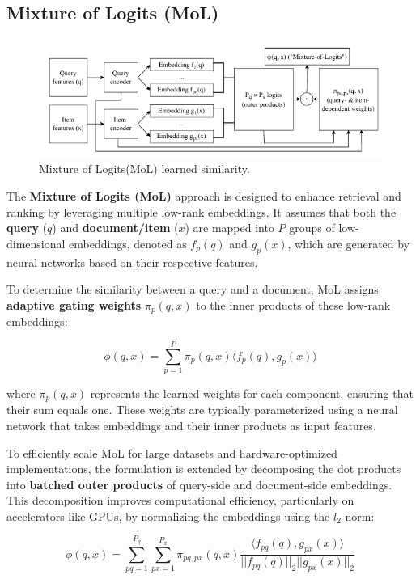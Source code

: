 \subsection{Mixture of Logits (MoL)}
\begin{figure}[h]
	\centering
	\includegraphics[width=0.7\linewidth]{Figures/mol.png}
	\caption{Mixture of Logits(MoL) learned similarity.\cite{Ding2024}}
	\label{Mixture_of_Logits }	
\end{figure}
The \textbf{Mixture of Logits (MoL)}\cite{zhai2023revisiting}\cite{Ding2024} approach is designed to enhance retrieval and ranking by leveraging multiple low-rank embeddings. It assumes that both the \textbf{query} (\( q \)) and \textbf{document/item} (\( x \)) are mapped into \( P \) groups of low-dimensional embeddings, denoted as \( f_p(q) \) and \( g_p(x) \), which are generated by neural networks based on their respective features.

To determine the similarity between a query and a document, MoL assigns \textbf{adaptive gating weights} \( \pi_p(q,x) \) to the inner products of these low-rank embeddings\cite{zhai2023revisiting}:

\begin{equation}
	\phi(q,x) = \sum_{p=1}^{P} \pi_p(q,x) \langle f_p(q), g_p(x) \rangle
\end{equation}

where \( \pi_p(q,x) \) represents the learned weights for each component, ensuring that their sum equals one. These weights are typically parameterized using a neural network that takes embeddings and their inner products as input features.

To efficiently scale MoL for large datasets and hardware-optimized implementations, the formulation is extended by decomposing the dot products into \textbf{batched outer products} of query-side and document-side embeddings. This decomposition improves computational efficiency, particularly on accelerators like GPUs, by normalizing the embeddings using the \( l_2 \)-norm:\cite{zhai2023revisiting}

\begin{equation}
	\phi(q,x) = \sum_{pq=1}^{P_q} \sum_{px=1}^{P_x} \pi_{pq,px}(q,x) \frac{\langle f_{pq}(q), g_{px}(x) \rangle}{|| f_{pq}(q) ||_2 || g_{px}(x) ||_2}
\end{equation}


